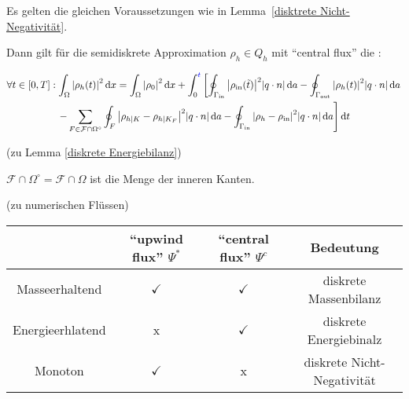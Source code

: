 \begin{Lemma} \label{diskrete Energiebilanz}	Es gelten die gleichen Voraussetzungen wie in Lemma~\ref{disktrete Nicht-Negativität}.
	
	Dann gilt für die semidiskrete Approximation $ \rho_h \in Q_h $ mit \enquote{central flux} die :
	
	\begin{gather*}
		\forall t \in [0,T]: \int_\Omega \abs{\rho_h(t)}^2 \mathop{}\!\mathrm{d} x = \int_\Omega \abs{\rho_0}^2 \mathop{}\!\mathrm{d} x + \int_{0}^{\textcolor{blue}{t}} \left[ \oint_{\Gamma_{{\text{in}}}} \abs{\rho_{\text{in}}(\tilde{t})}^2 \abs{q \cdot n} \mathop{}\!\mathrm{d} a - \oint_{\Gamma_{{\text{out}}}} \abs{\rho_h(t)}^2 \abs{q \cdot n} \mathop{}\!\mathrm{d} a \right. \\
		\left. - \sum_{F\in \mathcal{F} \cap \Omega^\circ} \oint_F \abs{\rho_{h|K} - \rho_{h|K_F}}^2 \abs{q \cdot n} \mathop{}\!\mathrm{d} a - \oint_{\Gamma_{{\text{in}}}} \abs{\rho_h - \rho_{\text{in}}}^2 \abs{q\cdot n} \mathop{}\!\mathrm{d} a \right] \mathop{}\!\mathrm{d} t
	\end{gather*}
	
\end{Lemma}
 
 
 \begin{remark}(zu Lemma \ref{diskrete Energiebilanz})
 	
 	$ \mathcal{F} \cap \Omega^\circ = \mathcal{F} \cap \Omega $ ist die Menge der inneren Kanten.
 \end{remark}

\begin{remark}(zu numerischen Flüssen)
	

	\begin{tabular}{c || c | c | c}
		&\enquote{upwind flux} $ \Psi^* $ & \enquote{central flux} $ \Psi^c $ & Bedeutung \\ \hline 
		Masseerhaltend & $\checkmark$ & $\checkmark$ & diskrete Massenbilanz \\ \hline
		Energieerhlatend &  x  & $ \checkmark $ & diskrete Energiebinalz\\ \hline
		Monoton & $ \checkmark $ & x & diskrete Nicht-Negativität \\
	\end{tabular}
\end{remark}
\newpage
